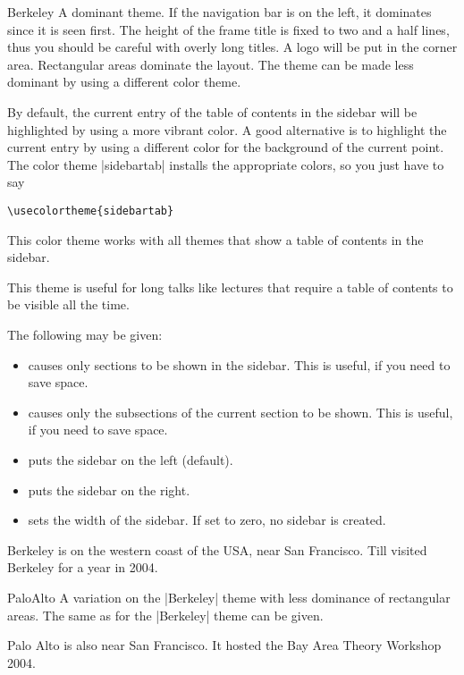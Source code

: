 \begin{themeexample}{Berkeley}
  A dominant theme. If the navigation bar is on the left, it dominates since it is seen first. The height of the frame title is fixed to two and a half lines, thus you should be careful with overly long titles. A logo will be put in the corner area. Rectangular areas dominate the layout. The theme can be made less dominant by using a different color theme.

  By default, the current entry of the table of contents in the sidebar will be highlighted by using a more vibrant color. A good alternative is to highlight the current entry by using a different color for the background of the current point. The color theme |sidebartab| installs the appropriate colors, so you just have to say
\begin{verbatim}
\usecolortheme{sidebartab}
\end{verbatim}

  This color theme works with all themes that show a table of contents in the sidebar.

  This theme is useful for long talks like lectures that require a table of contents to be visible all the time.

  The following  may be given:
  \begin{itemize}
  \item {} causes only sections to be shown in the sidebar. This is useful, if you need to save space.
  \item {} causes only the subsections of the current section to be shown. This is useful, if you need to save space.
  \item {} puts the sidebar on the left (default).
  \item {} puts the sidebar on the right.
  \item {} sets the width of the sidebar. If set to zero, no sidebar is created.
  \end{itemize}

  Berkeley is on the western coast of the USA, near San Francisco. Till visited Berkeley for a year in 2004.
\end{themeexample}

\begin{themeexample}{PaloAlto}
  A variation on the |Berkeley| theme with less dominance of rectangular areas. The same  as for the |Berkeley| theme can be given.

  Palo Alto is also near San Francisco. It hosted the Bay Area Theory Workshop 2004.
\end{themeexample}

